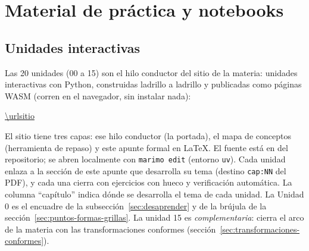 \section{Material de práctica y notebooks}\label{cap:notebooks}\label{ap:notebooks}

\subsection{Unidades interactivas}

Las 20 unidades (00 a 15) son el hilo conductor del sitio de la materia: unidades interactivas
con Python, construidas ladrillo a ladrillo y publicadas como
páginas WASM (corren en el navegador, sin instalar nada):

\begin{center}\url{\urlsitio}\end{center}

El sitio tiene tres capas: ese hilo conductor (la portada), el mapa de conceptos
(herramienta de repaso) y este apunte formal en \LaTeX{}. El fuente está en
 del repositorio; se abren localmente con \texttt{marimo edit}
(entorno \texttt{uv}). Cada unidad enlaza a la sección de este apunte que desarrolla su
tema (destino \texttt{cap:NN} del PDF), y cada una cierra con ejercicios con hueco y
verificación automática. La columna \enquote{capítulo} indica dónde se desarrolla el tema de cada unidad. La Unidad 0 es el
encuadre de la subsección~\ref{sec:desaprender} y de la brújula de la
sección~\ref{sec:puntos-formas-grillas}. La unidad 15 es \emph{complementaria}: cierra el arco de la materia con las
transformaciones conformes (sección~\ref{sec:transformaciones-conformes}).

